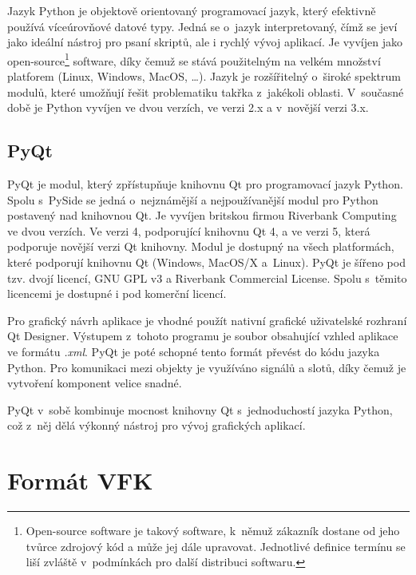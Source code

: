\documentclass[12pt]{article}
\begin{document}
Jazyk Python je objektově orientovaný programovací jazyk, který efektivně používá víceúrovňové datové typy. Jedná se o~jazyk interpretovaný, čímž se jeví jako ideální nástroj pro psaní skriptů, ale i rychlý vývoj aplikací. Je vyvíjen jako open-source\footnote{Open-source software je takový software, k~němuž zákazník dostane od jeho tvůrce zdrojový kód a může jej dále upravovat. Jednotlivé definice termínu  se liší zvláště v~podmínkách pro další distribuci softwaru.\cite{abclinuxu_opensource}} software, díky čemuž se stává použitelným na velkém množství platforem (Linux, Windows, MacOS, \dots). Jazyk je rozšířitelný o~široké spektrum modulů, které umožňují řešit problematiku takřka z~jakékoli oblasti. V~současné době je Python vyvíjen ve dvou verzích, ve verzi 2.x a v~novější verzi 3.x.
\cite{dive_into_python}
\cite{python_web}

\subsection{PyQt}

PyQt je modul, který zpřístupňuje knihovnu Qt pro programovací jazyk Python. Spolu s~PySide se jedná o~nejznámější a nejpoužívanější modul pro Python postavený nad knihovnou Qt. Je vyvíjen britskou firmou Riverbank Computing ve dvou verzích. Ve verzi 4, podporující knihovnu Qt 4, a ve verzi 5, která podporuje novější verzi Qt knihovny. Modul je dostupný na všech platformách, které podporují knihovnu Qt (Windows, MacOS/X a~Linux). PyQt je šířeno pod tzv. dvojí licencí, GNU GPL v3 a  Riverbank Commercial License. Spolu s~těmito licencemi je dostupné i pod komerční licencí.

Pro grafický návrh aplikace je vhodné použít nativní grafické uživatelské rozhraní Qt Designer. Výstupem z~tohoto programu je soubor obsahující vzhled aplikace ve formátu \textit{.xml}. PyQt je poté schopné tento formát převést do kódu jazyka Python. Pro komunikaci mezi objekty je využíváno signálů a slotů, díky čemuž je vytvoření komponent velice snadné.

PyQt v~sobě kombinuje mocnost knihovny Qt s~jednoduchostí jazyka Python, což z~něj dělá výkonný nástroj pro vývoj grafických aplikací.
\cite{pyqt}

\clearpage
\section{Formát VFK}

\cite{dp_landa}
\cite{vfk_struktura}
\end{document}
